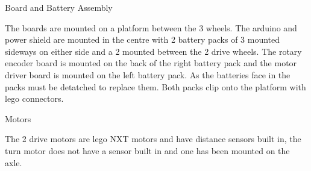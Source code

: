 \documentclass[11pt,a4paper]{article}
\begin{document}
\maketitle 
Board and Battery Assembly

The boards are mounted on a platform between the 3 wheels. The arduino and power
shield are mounted in the centre with 2 battery packs of 3 mounted sideways on either
side and a 2 mounted between the 2 drive wheels. The rotary encoder board is
mounted on the back of the right battery pack and the motor driver board is mounted
on the left battery pack. As the batteries face in the packs must be detatched to
replace them. Both packs clip onto the platform with lego connectors.

\maketitle 
Motors

The 2 drive motors are lego NXT motors and have distance sensors built in, the
turn motor does not have a sensor built in and one has been mounted on the axle. 
\end{document}
